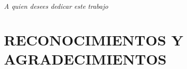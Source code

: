 \documentclass[letterpaper,titlepage,12pt,oneside,spanish,final]{report_eie}
\begin{document}




\begin{figure}
        \begin{center}

        \vspace{0.5mm}
        \label{Fig.aprobacion}
        \end{center}
        \end{figure}
\thispagestyle{empty}

\newpage

\begin{figure}
        \begin{center}
        \vspace{0.5mm}
        \label{Fig.mencion}
        \end{center}
\end{figure}
\thispagestyle{empty}

\newpage%
\newenvironment{dedication}%
{\cleardoublepage \thispagestyle{empty} %
\begin{center} \em} {\end{center}  }%
\begin{dedication}%
A quien desees dedicar este trabajo
\end{dedication}%

\chapter*{RECONOCIMIENTOS Y AGRADECIMIENTOS}
%
\end{document}
